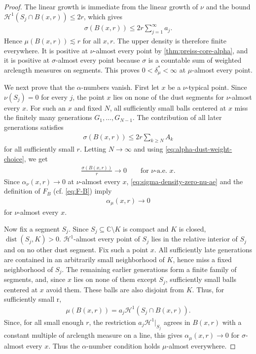 \documentclass[11pt,a4paper,english,reqno]{amsart}
\newcommand{\hd}[1]{\mathcal{H}^{#1}}
\numberwithin{equation}{section}
\newcommand{\CC}[0]{\mathbb{C}}
\renewcommand{\subset}{\subseteq}
\DeclareMathOperator{\dist}{dist}
\renewcommand{\restriction}{\big|}
\numberwithin{definition}{section}
\begin{document}
\begin{proof}
  The linear growth is immediate from the linear growth of $\nu$ and the bound $\hd1(S_j\cap B(x,r))\le2r$, which gives
  \begin{align}
    \sigma(B(x,r))\le2r\sum_{j=1}^{∞} a_j .
  \end{align}
  Hence $\mu(B(x,r))\lesssim r$ for all $x,r$.  The upper density is therefore finite everywhere.  It is positive at $\nu$-almost every point by \cref{thm:preiss-core-alpha}, and it is positive at $\sigma$-almost every point because $\sigma$ is a countable sum of weighted arclength measures on segments.  This proves $0<\delta_\mu^*<\infty$ at $\mu$-almost every point.

  We next prove that the $\alpha$-numbers vanish.  First let $x$ be a $\nu$-typical point.  Since $\nu(S_j)=0$ for every $j$, the point $x$ lies on none of the dust segments for $\nu$-almost every $x$.  For such an $x$ and fixed $N$, all sufficiently small balls centered at $x$ miss the finitely many generations $G_1,\dots,G_{N-1}$.  The contribution of all later generations satisfies
  \begin{align}
    \sigma(B(x,r))
    \le 2r\sum_{k\ge N}A_k
  \end{align}
  for all sufficiently small $r$.  Letting $N\to\infty$ and using \cref{eq:alpha-dust-weight-choice}, we get
  \begin{align}\label{eq:sigma-density-zero-nu-ae}
    \frac{\sigma(B(x,r))}{r}\to0
    \qquad\text{for }\nu\text{-a.e. }x.
  \end{align}
  Since $\alpha_{\nu}(x,r)\to0$ at $\nu$-almost every $x$, \cref{eq:sigma-density-zero-nu-ae} and the definition of $F_B$ (cf. \cref{eq:F-B}) imply
  \begin{align}
    \alpha_{\mu}(x,r)\to0
  \end{align}
  for $\nu$-almost every $x$.

  Now fix a segment $S_j$.  Since $S_j\subset\CC\setminus K$ is compact and $K$ is closed, $\dist(S_j,K)>0$. 
  $\hd1$-almost every point of $S_j$ lies in the relative interior of $S_j$ and on no other dust segment.
  Fix such a point $x$.  All sufficiently late generations are contained in an arbitrarily small neighborhood of $K$, hence miss a fixed neighborhood of $S_j$.  The remaining earlier generations form a finite family of segments, and, since $x$ lies on none of them except $S_j$, sufficiently small balls centered at $x$ avoid them.  These balls are also disjoint from $K$.  Thus, for sufficiently small r,
  \begin{align}
    \mu(B(x,r)) = a_j\hd1(S_j\cap B(x,r)).
  \end{align}
  Since, for all small enough $r$, the restriction $a_j\hd1\restriction_{S_j}$ agrees in $B(x,r)$ with a constant multiple of arclength measure on a line, this gives $\alpha_{\mu}(x,r)\to0$ for $\sigma$-almost every $x$.
  Thus the $\alpha$-number condition holds $\mu$-almost everywhere.


\end{proof}
\end{document}
